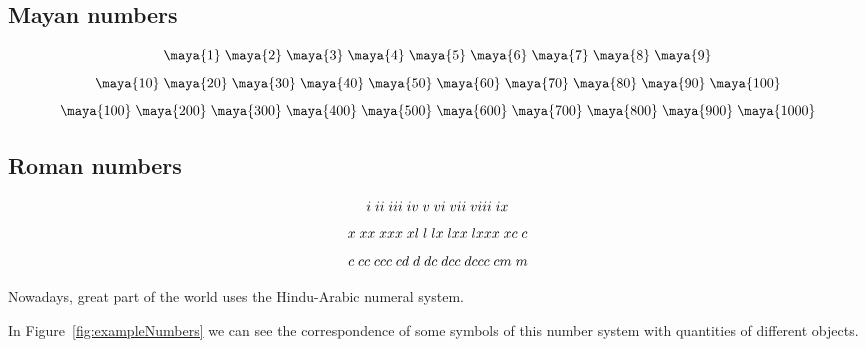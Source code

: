 \documentclass[../../mathematics_cheat_sheet.tex]{subfiles}
\begin{document}
\subsection{Mayan numbers}
\[
  \maya{1}\;
  \maya{2}\;
  \maya{3}\;
  \maya{4}\;
  \maya{5}\;
  \maya{6}\;
  \maya{7}\;
  \maya{8}\;
  \maya{9}
\]
\[
  \maya{10}\;
  \maya{20}\;
  \maya{30}\;
  \maya{40}\;
  \maya{50}\;
  \maya{60}\;
  \maya{70}\;
  \maya{80}\;
  \maya{90}\;
  \maya{100}
\]
\[
  \maya{100}\;
  \maya{200}\;
  \maya{300}\;
  \maya{400}\;
  \maya{500}\;
  \maya{600}\;
  \maya{700}\;
  \maya{800}\;
  \maya{900}\;
  \maya{1000}
\]

\subsection{Roman numbers}
\[
  \rom{1}\;
  \rom{2}\;
  \rom{3}\;
  \rom{4}\;
  \rom{5}\;
  \rom{6}\;
  \rom{7}\;
  \rom{8}\;
  \rom{9}
\]
\[
  \rom{10}\;
  \rom{20}\;
  \rom{30}\;
  \rom{40}\;
  \rom{50}\;
  \rom{60}\;
  \rom{70}\;
  \rom{80}\;
  \rom{90}\;
  \rom{100}
\]
\[
  \rom{100}\;
  \rom{200}\;
  \rom{300}\;
  \rom{400}\;
  \rom{500}\;
  \rom{600}\;
  \rom{700}\;
  \rom{800}\;
  \rom{900}\;
  \rom{1000}
\]

Nowadays, great part of the world uses the Hindu-Arabic numeral system.

In Figure~\ref{fig:exampleNumbers} we can see the correspondence of some symbols of this number system with quantities of different objects.
\end{document}

